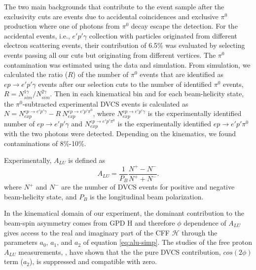 \documentclass[twocolumn,nofootinbib,showpacs,prl,superscriptaddress,secnumarabic,amssymb,nobibnotes,aps,floatfix]{revtex4}
\begin{document}
The two main backgrounds that contribute to the event sample after the exclusivity cuts are  
events due to accidental coincidences and exclusive $\pi^0$ production where one of photons from $\pi^0$ decay escape the detection. For the accidental events, i.e., $e'p'\gamma$ collection 
with particles originated from different electron scattering events, their contribution of 6.5\% 
was evaluated by selecting events passing all our cuts but originating from 
different vertices. The $\pi^0$ contamination 
was estimated 
using the data and simulation. From simulation, we 
calculated the ratio ($R$) of the number of $\pi^0$ events that are identified as $ep\rightarrow e'p'\gamma$ events after our selection cuts to the number of identified $\pi^0$ events, $R = N^{1\gamma}_{sim}/N^{2\gamma}_{sim}$. Then in each kinematical bin and for 
each beam-helicity state, the $\pi^0$-subtracted experimental DVCS events is 
calculated as $N = N^{ep\rightarrow e'p'\gamma}_{exp}- R~N^{ep\rightarrow 
e'p'\pi^0}_{exp}$, where $N^{ep\rightarrow e'p'\gamma}_{exp}$ is the 
experimentally identified number of $ep\rightarrow e'p'\gamma$ and 
$N^{ep\rightarrow e'p'\pi^0}_{exp}$ is the experimentally identified 
$ep\rightarrow e'p'\pi^0$ with the two photons were detected. Depending on the 
kinematics, we found contaminations of 8\%-10\%. 



Experimentally, $A_{LU}$ 
is defined as
\begin{equation}
A_{LU} = \frac{1}{P_{B}} \frac{N^{+} - N^{-}}{N^{+} + N^{-} }.
\end{equation}
where $N^{+}$ and $N^{-}$ are the number of DVCS events for positive and negative  beam-helicity state, and $P_{B}$ is the longitudinal beam polarization.  

In the kinematical domain of our experiment, the dominant contribution to the beam-spin asymmetry comes from GPD H \cite{Guidal:2013rya} and
therefore $\phi$ dependence of $A_{LU}$ gives access to the real and imaginary part of the CFF $\mathcal{H}$ through 
the parameters $a_0$, $a_1$, and $a_2$ of equation \ref{eq:alu-simp}. The studies of  
the free proton $A_{LU}$ measurements, \cite{Girod:2007aa}, have 
shown that the the pure DVCS contribution, $cos(2\phi)$ term ($a_2$), is suppressed and compatible with zero.  
\end{document}

